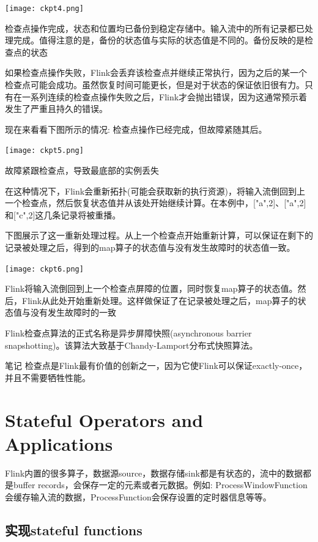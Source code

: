 \documentclass[oneside]{ctexbook}
\begin{document}
\noindent \texttt{[image: ckpt4.png]}

检查点操作完成，状态和位置均已备份到稳定存储中。输入流中的所有记录都已处理完成。值得注意的是，备份的状态值与实际的状态值是不同的。备份反映的是检查点的状态

如果检查点操作失败，Flink会丢弃该检查点并继续正常执行，因为之后的某一个检查点可能会成功。虽然恢复时间可能更长，但是对于状态的保证依旧很有力。只有在一系列连续的检查点操作失败之后，Flink才会抛出错误，因为这通常预示着发生了严重且持久的错误。

现在来看看下图所示的情况: 检查点操作已经完成，但故障紧随其后。

\noindent \texttt{[image: ckpt5.png]}

故障紧跟检查点，导致最底部的实例丢失

在这种情况下，Flink会重新拓扑(可能会获取新的执行资源)，将输入流倒回到上一个检查点，然后恢复状态值并从该处开始继续计算。在本例中，["a",2]、["a",2]和["c",2]这几条记录将被重播。

下图展示了这一重新处理过程。从上一个检查点开始重新计算，可以保证在剩下的记录被处理之后，得到的map算子的状态值与没有发生故障时的状态值一致。

\noindent \texttt{[image: ckpt6.png]}

Flink将输入流倒回到上一个检查点屏障的位置，同时恢复map算子的状态值。然后，Flink从此处开始重新处理。这样做保证了在记录被处理之后，map算子的状态值与没有发生故障时的一致

Flink检查点算法的正式名称是异步屏障快照(asynchronous barrier snapshotting)。该算法大致基于Chandy-Lamport分布式快照算法。

\begin{bclogo}[logo=\bcinfo, couleurBarre=orange, noborder=true, couleur=white]{笔记}
检查点是Flink最有价值的创新之一，因为它使Flink可以保证exactly-once，并且不需要牺牲性能。
\end{bclogo}

\section{Stateful Operators and Applications}

Flink内置的很多算子，数据源source，数据存储sink都是有状态的，流中的数据都是buffer records，会保存一定的元素或者元数据。例如: ProcessWindowFunction会缓存输入流的数据，ProcessFunction会保存设置的定时器信息等等。

\subsection{实现stateful functions}
\end{document}
